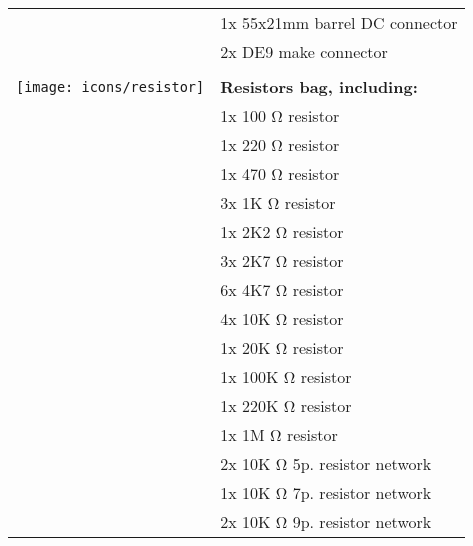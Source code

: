 \begin{longtable}{m{10mm}|l}
	                                      & 1x 55x21mm barrel DC connector                              \\
	                                      & 2x DE9 make connector                                       \\
	                                      &                                                             \\
	\texttt{[image: icons/resistor]}      & {\bf Resistors bag, including:}                             \\
	                                      & 1x 100 \si{\ohm} resistor                                   \\
	                                      & 1x 220 \si{\ohm} resistor                                   \\
	                                      & 1x 470 \si{\ohm} resistor                                   \\
	                                      & 3x 1K \si{\ohm} resistor                                    \\
	                                      & 1x 2K2 \si{\ohm} resistor                                   \\
	                                      & 3x 2K7 \si{\ohm} resistor                                   \\
	                                      & 6x 4K7 \si{\ohm} resistor                                   \\
	                                      & 4x 10K \si{\ohm} resistor                                   \\
	                                      & 1x 20K \si{\ohm} resistor                                   \\
	                                      & 1x 100K \si{\ohm} resistor                                  \\
	                                      & 1x 220K \si{\ohm} resistor                                  \\
	                                      & 1x 1M \si{\ohm} resistor                                    \\
	                                      & 2x 10K \si{\ohm} 5p. resistor network                       \\
	                                      & 1x 10K \si{\ohm} 7p. resistor network                       \\
	                                      & 2x 10K \si{\ohm} 9p. resistor network                       \\

\end{longtable}
